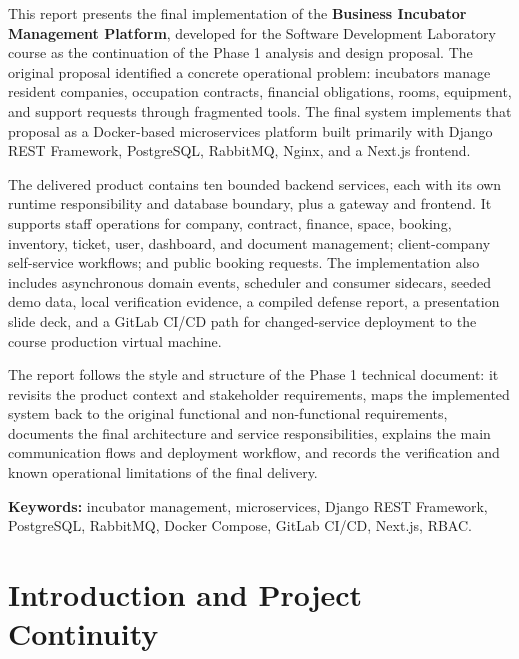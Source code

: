 \documentclass[12pt,a4paper]{report}
\begin{document}
This report presents the final implementation of the \textbf{Business Incubator
Management Platform}, developed for the Software Development Laboratory course
as the continuation of the Phase 1 analysis and design proposal. The original
proposal identified a concrete operational problem: incubators manage resident
companies, occupation contracts, financial obligations, rooms, equipment, and
support requests through fragmented tools. The final system implements that
proposal as a Docker-based microservices platform built primarily with Django
REST Framework, PostgreSQL, RabbitMQ, Nginx, and a Next.js frontend.

The delivered product contains ten bounded backend services, each with its own
runtime responsibility and database boundary, plus a gateway and frontend. It
supports staff operations for company, contract, finance, space, booking,
inventory, ticket, user, dashboard, and document management; client-company
self-service workflows; and public booking requests. The implementation also
includes asynchronous domain events, scheduler and consumer sidecars, seeded
demo data, local verification evidence, a compiled defense report, a presentation
slide deck, and a GitLab CI/CD path for changed-service deployment to the course
production virtual machine.

The report follows the style and structure of the Phase 1 technical document: it
revisits the product context and stakeholder requirements, maps the implemented
system back to the original functional and non-functional requirements, documents
the final architecture and service responsibilities, explains the main
communication flows and deployment workflow, and records the verification and
known operational limitations of the final delivery.

\vspace{1cm}
\noindent\textbf{Keywords:} incubator management, microservices, Django REST
Framework, PostgreSQL, RabbitMQ, Docker Compose, GitLab CI/CD, Next.js, RBAC.

\newpage
\tableofcontents
\newpage
\listoftables
\newpage


\chapter{Introduction and Project Continuity}
\label{ch:introduction}
\end{document}
